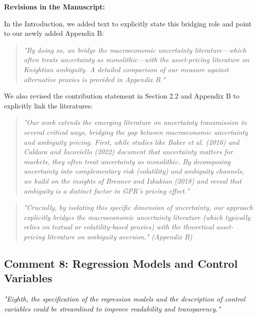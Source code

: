 \documentclass[12pt]{article}
\begin{document}
\begin{highlightbox}
\textbf{Revisions in the Manuscript:}

In the Introduction, we added text to explicitly state this bridging role and point to our newly added Appendix B:
\vspace{0.2cm}
\begin{quote}
\color{red}\itshape "By doing so, we bridge the macroeconomic uncertainty literature---which often treats uncertainty as monolithic---with the asset-pricing literature on 
\color{red}\itshape Knightian ambiguity. A detailed comparison of our measure against alternative proxies is provided in Appendix B."
\end{quote}
\vspace{0.2cm}

We also revised the contribution statement in Section 2.2 and Appendix B to explicitly link the literatures:
\vspace{0.1cm}
\begin{quote}
\color{red}\itshape "Our work extends the emerging literature on uncertainty transmission in several critical ways, bridging the gap between macroeconomic uncertainty and ambiguity pricing. First, while studies like Baker et al. (2016) and Caldara and Iacoviello (2022) document that uncertainty matters for markets, they often treat uncertainty as monolithic. By decomposing uncertainty into complementary risk (volatility) and ambiguity channels, we build on the insights of Brenner and Izhakian (2018) and reveal that ambiguity is a distinct factor in GPR's pricing effect."
\end{quote}

\begin{quote}
\color{red}\itshape "Crucially, by isolating this specific dimension of uncertainty, our approach explicitly bridges the macroeconomic uncertainty literature (which typically relies on textual or volatility-based proxies) with the theoretical asset-pricing literature on ambiguity aversion." (Appendix B)
\end{quote}
\end{highlightbox}

\subsection*{Comment 8: Regression Models and Control Variables}
\textit{"Eighth, the specification of the regression models and the description of control variables could be streamlined to improve readability and transparency."}
\end{document}
